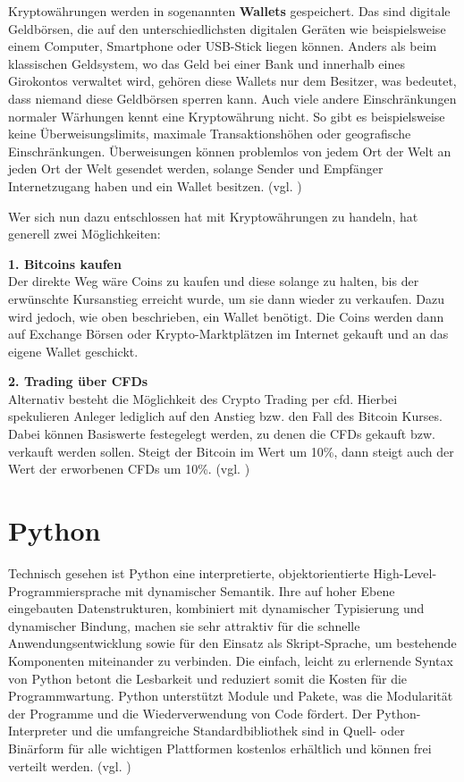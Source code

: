 \documentclass[oneside]{ausarbeitung}
\begin{document}
Kryptowährungen werden in sogenannten \textbf{Wallets} gespeichert. Das sind digitale Geldbörsen, die auf den unterschiedlichsten digitalen Geräten wie beispielsweise einem Computer, Smartphone oder USB-Stick liegen können. Anders als beim klassischen Geldsystem, wo das Geld bei einer Bank und innerhalb eines Girokontos verwaltet wird, gehören diese Wallets nur dem Besitzer, was bedeutet, dass niemand diese Geldbörsen sperren kann. Auch viele andere Einschränkungen normaler Wärhungen kennt eine Kryptowährung nicht. So gibt es beispielsweise keine Überweisungslimits, maximale Transaktionshöhen oder geografische Einschränkungen. Überweisungen können problemlos von jedem Ort der Welt an jeden Ort der Welt gesendet werden, solange Sender und Empfänger Internetzugang haben und ein Wallet besitzen. (vgl. \cite{bitcoins_erklärung})

Wer sich nun dazu entschlossen hat mit Kryptowährungen zu handeln, hat generell zwei Möglichkeiten:

\textbf{1. Bitcoins kaufen} \\
Der direkte Weg wäre Coins zu kaufen und diese solange zu halten, bis der erwünschte Kursanstieg erreicht wurde, um sie dann wieder zu verkaufen. Dazu wird jedoch, wie oben beschrieben, ein Wallet benötigt. Die Coins werden dann auf Exchange Börsen oder Krypto-Marktplätzen im Internet gekauft und an das eigene Wallet geschickt. 

\textbf{2. Trading über CFDs} \\
Alternativ besteht die Möglichkeit des Crypto Trading per \ac{cfd}. Hierbei spekulieren Anleger lediglich auf den Anstieg bzw. den Fall des Bitcoin Kurses. Dabei können Basiswerte festegelegt werden, zu denen die CFDs gekauft bzw. verkauft werden sollen. Steigt der Bitcoin im Wert um 10\%, dann steigt auch der Wert der erworbenen CFDs um 10\%. (vgl. \cite{crypto_trading})


\section{Python}
\label{sec:python}

Technisch gesehen ist Python eine interpretierte, objektorientierte High-Level-Programmiersprache mit dynamischer Semantik. Ihre auf hoher Ebene eingebauten
Datenstrukturen, kombiniert mit dynamischer Typisierung und dynamischer Bindung, machen sie sehr attraktiv für die schnelle Anwendungsentwicklung sowie
für den Einsatz als Skript-Sprache, um bestehende Komponenten miteinander zu
verbinden. Die einfach, leicht zu erlernende Syntax von Python betont die Lesbarkeit und reduziert somit die Kosten für die Programmwartung. Python unterstützt
Module und Pakete, was die Modularität der Programme und die Wiederverwendung
von Code fördert. Der Python-Interpreter und die umfangreiche Standardbibliothek
sind in Quell- oder Binärform für alle wichtigen Plattformen kostenlos erhältlich
und können frei verteilt werden. (vgl. \cite{python_definition})
\end{document}
